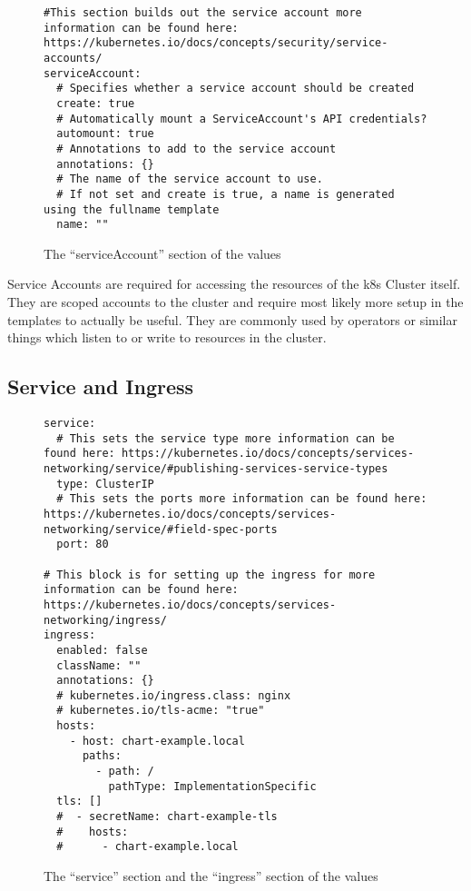 \begin{figure}[h]
\begin{verbatim}
#This section builds out the service account more information can be found here: https://kubernetes.io/docs/concepts/security/service-accounts/
serviceAccount:
  # Specifies whether a service account should be created
  create: true
  # Automatically mount a ServiceAccount's API credentials?
  automount: true
  # Annotations to add to the service account
  annotations: {}
  # The name of the service account to use.
  # If not set and create is true, a name is generated using the fullname template
  name: ""
\end{verbatim}
\caption{The \enquote{serviceAccount} section of the \gls{values}}\label{code:service_account_section}
\end{figure}

Service Accounts are required for accessing the resources of the \gls{k8s} Cluster itself.
They are scoped accounts to the cluster and require most likely more setup in the templates to actually be useful.
They are commonly used by operators or similar things which listen to or write to resources in the cluster.
\clearpage

\subsection{Service and Ingress}
\lipsum[2-4]

\begin{figure}[h]
\begin{verbatim}
service:
  # This sets the service type more information can be found here: https://kubernetes.io/docs/concepts/services-networking/service/#publishing-services-service-types
  type: ClusterIP
  # This sets the ports more information can be found here: https://kubernetes.io/docs/concepts/services-networking/service/#field-spec-ports
  port: 80

# This block is for setting up the ingress for more information can be found here: https://kubernetes.io/docs/concepts/services-networking/ingress/
ingress:
  enabled: false
  className: ""
  annotations: {}
  # kubernetes.io/ingress.class: nginx
  # kubernetes.io/tls-acme: "true"
  hosts:
    - host: chart-example.local
      paths:
        - path: /
          pathType: ImplementationSpecific
  tls: []
  #  - secretName: chart-example-tls
  #    hosts:
  #      - chart-example.local
\end{verbatim}
\caption{The \enquote{service} section and the \enquote{ingress} section of the \gls{values}}\label{code:service_and_ingress_section}
\end{figure}
\clearpage

